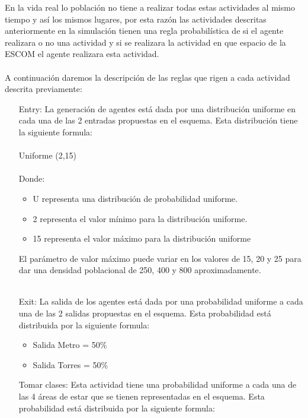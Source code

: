 \documentclass[a4paper,10pt]{article}
\begin{document}
En la vida real lo poblaci\'on no tiene a realizar todas estas actividades al mismo tiempo y as\'i los mismos lugares, por esta raz\'on las actividades descritas anteriormente en la simulaci\'on tienen una regla probabil\'istica de si el agente realizara o no una actividad y si se realizara la actividad en que espacio de la ESCOM el agente realizara esta actividad.
\\ \\
A continuaci\'on daremos la descripci\'on de las reglas que rigen a cada actividad descrita previamente:

\begin{enumerate}
 \item[Entry:]La generaci\'on de agentes est\'a dada por una distribuci\'on uniforme en cada una de las 2 entradas propuestas en el esquema. Esta distribuci\'on tiene la siguiente formula:
\\ \\
Uniforme (2,15)
\\ \\
Donde: 
\begin{itemize}
 \item U representa una distribuci\'on de probabilidad uniforme.
 \item 2 representa el valor m\'inimo para la distribuci\'on uniforme.
 \item 15 representa el valor m\'aximo para la distribuci\'on uniforme
\end{itemize}

El par\'ametro de valor m\'aximo puede variar en los valores de 15, 20 y 25 para dar una densidad poblacional de 250, 400 y 800 aproximadamente.
\\ \\

 
 \item[Exit:]La salida de los agentes est\'a dada por una probabilidad uniforme a cada una de las 2 salidas propuestas en el esquema. Esta probabilidad est\'a distribuida por la siguiente formula:

\begin{itemize}
 \item Salida Metro = 50\%
 \item Salida Torres = 50\%
\end{itemize}

 \item[Tomar clases:]Esta actividad tiene una probabilidad uniforme a cada una de las 4 \'areas de estar que se tienen representadas en el esquema. Esta probabilidad est\'a distribuida por la siguiente formula:


\end{enumerate}
\end{document}
